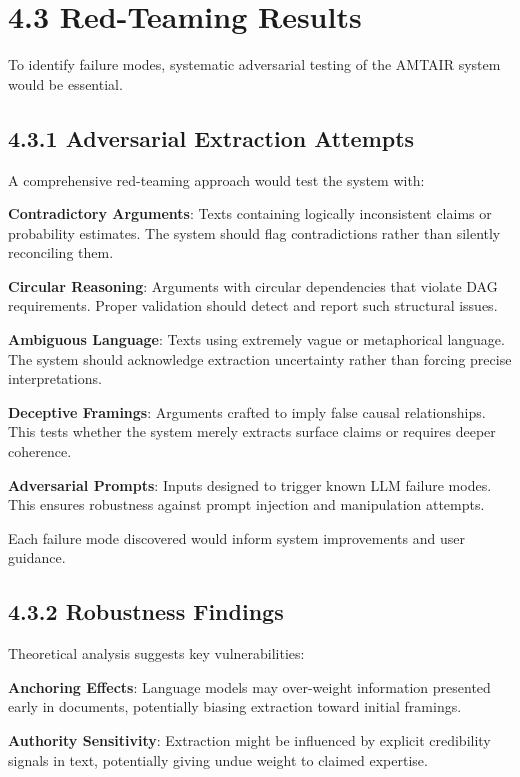 \documentclass[
  11pt,
  letterpaper,
]{book}
\begin{document}
\section{4.3 Red-Teaming Results}\label{sec-red-teaming}

To identify failure modes, systematic adversarial testing of the AMTAIR
system would be essential.

\subsection{4.3.1 Adversarial Extraction
Attempts}\label{sec-adversarial-extraction}

A comprehensive red-teaming approach would test the system with:

\textbf{Contradictory Arguments}: Texts containing logically
inconsistent claims or probability estimates. The system should flag
contradictions rather than silently reconciling them.

\textbf{Circular Reasoning}: Arguments with circular dependencies that
violate DAG requirements. Proper validation should detect and report
such structural issues.

\textbf{Ambiguous Language}: Texts using extremely vague or metaphorical
language. The system should acknowledge extraction uncertainty rather
than forcing precise interpretations.

\textbf{Deceptive Framings}: Arguments crafted to imply false causal
relationships. This tests whether the system merely extracts surface
claims or requires deeper coherence.

\textbf{Adversarial Prompts}: Inputs designed to trigger known LLM
failure modes. This ensures robustness against prompt injection and
manipulation attempts.

Each failure mode discovered would inform system improvements and user
guidance.

\subsection{4.3.2 Robustness Findings}\label{sec-robustness-findings}

Theoretical analysis suggests key vulnerabilities:

\textbf{Anchoring Effects}: Language models may over-weight information
presented early in documents, potentially biasing extraction toward
initial framings.

\textbf{Authority Sensitivity}: Extraction might be influenced by
explicit credibility signals in text, potentially giving undue weight to
claimed expertise.
\end{document}
